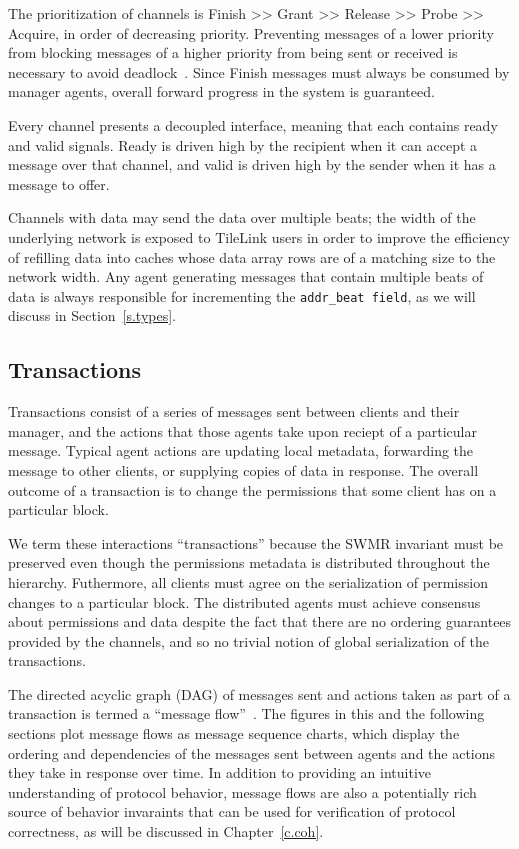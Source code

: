 The prioritization of channels is Finish >> Grant >> Release >> Probe >> Acquire, in order of decreasing priority.
Preventing messages of a lower priority from blocking messages of a higher priority from being sent or received is necessary to avoid deadlock~\cite{sorin2011primer}.
Since Finish messages must always be consumed by manager agents, overall forward progress in the system is guaranteed.

Every channel presents a decoupled interface, meaning that each contains ready and valid signals.
Ready is driven high by the recipient when it can accept a message over that channel,
and valid is driven high by the sender when it has a message to offer.

Channels with data may send the data over multiple beats; the width of the underlying network is exposed to TileLink users in order to
improve the efficiency of refilling data into caches whose data array rows are of a matching size to the network width.
Any agent generating messages that contain multiple beats of data is always responsible for incrementing the {\tt addr\_beat field}, as we will discuss in Section~\ref{s.types}.

\subsection{Transactions}

Transactions consist of a series of messages sent between clients and their manager, and the actions that those agents take upon reciept of a particular message.
Typical agent actions are updating local metadata, forwarding the message to other clients, or supplying copies of data in response.
The overall outcome of a transaction is to change the permissions that some client has on a particular block.

We term these interactions ``transactions'' because the SWMR invariant must be preserved even though the permissions metadata is distributed throughout the hierarchy.
Futhermore, all clients must agree on the serialization of permission changes to a particular block.
The distributed agents must achieve consensus about permissions and data despite the fact that there are no ordering guarantees
provided by the channels, and so no trivial notion of global serialization of the transactions.

The directed acyclic graph (DAG) of messages sent and actions taken as part of a transaction is termed a ``message flow''~\cite{talupur}.
The figures in this and the following sections plot message flows as message sequence charts,
which display the ordering and dependencies of the messages sent between agents and the actions they take in response over time.
In addition to providing an intuitive understanding of protocol behavior, message flows are also a potentially
rich source of behavior invaraints that can be used for verification of protocol correctness, as will be discussed in Chapter~\ref{c.coh}.

